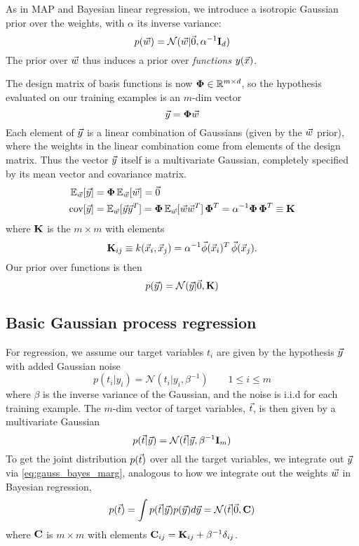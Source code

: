 \documentclass[11pt]{article}
\begin{document}
As in MAP and Bayesian linear regression, we introduce a isotropic Gaussian prior over
the weights, with $\alpha$ its inverse variance:
\begin{equation}
  p(\vec{w}) = \mathcal{N}(\vec{w} | \vec{0}, \alpha^{-1} \mathbf{I}_d)
\end{equation}
The prior over $\vec{w}$ thus induces a prior over \emph{functions} $y(\vec{x})$.

The design matrix of basis functions is now $\boldsymbol{\Phi} \in \mathbb{R}^{m \times d}$, so the
hypothesis evaluated on our training examples is an $m$-dim vector
\begin{equation}
  \vec{y} = \boldsymbol{\Phi} \vec{w}
\end{equation}
Each element of $\vec{y}$ is a linear combination of Gaussians (given by the $\vec{w}$
prior), where the weights in the linear combination come from elements of the design
matrix. Thus the vector $\vec{y}$ itself is a multivariate Gaussian, completely specified
by its mean vector and covariance matrix.
\begin{align}
  \mathbb{E}_{\vec{w}}[\vec{y}] &= \boldsymbol{\Phi}\, \mathbb{E}_{\vec{w}}[\vec{w}] = \vec{0} \\
  \textrm{cov}[\vec{y}]  &= \mathbb{E}_{\vec{w}}[\vec{y} \vec{y}^T]
                      = \boldsymbol{\Phi}\, \mathbb{E}_{\vec{w}}[\vec{w} \vec{w}^T]\, \boldsymbol{\Phi}^T
                      = \alpha^{-1} \boldsymbol{\Phi}\, \boldsymbol{\Phi}^T
                      \equiv \mathbf{K}
\end{align}
where $\mathbf{K}$ is the $m \times m$  with elements
\begin{equation}
  \mathbf{K}_{ij} \equiv k(\vec{x}_i, \vec{x}_j) = \alpha^{-1} \vec{\phi}(\vec{x}_i)^T\,
  \vec{\phi}(\vec{x}_j). 
\end{equation}
Our prior over functions is then
\begin{equation}
  p(\vec{y}) = \mathcal{N}(\vec{y} | \vec{0}, \mathbf{K})
\end{equation}

\subsection{Basic Gaussian process regression}
For regression, we assume our target variables $t_i$ are given by the hypothesis $\vec{y}$
with added Gaussian noise
\begin{equation}
  p(t_i | y_i) = \mathcal{N}(t_i | y_i, \beta^{-1}) \qquad 1 \leq i \leq m
\end{equation}
where $\beta$ is the inverse variance of the Gaussian, and the noise is i.i.d for each
training example. The $m$-dim vector of target variables, $\vec{t}$, is then given by a
multivariate Gaussian
\begin{equation}
  p(\vec{t} | \vec{y}) = \mathcal{N}(\vec{t} | \vec{y}, \beta^{-1} \mathbf{I}_m)
\end{equation}
To get the joint distribution $p(\vec{t})$ over all the target variables, we integrate out
$\vec{y}$ via \ref{eq:gauss_bayes_marg}, analogous to how we integrate out the weights
$\vec{w}$ in Bayesian regression,
\begin{equation}
  p(\vec{t}) = \int p(\vec{t} | \vec{y}) p(\vec{y}) d\vec{y} = \mathcal{N}(\vec{t} | \vec{0}, \mathbf{C})
\end{equation}
where $\mathbf{C}$ is $m \times m$ with elements
$\mathbf{C}_{ij} = \mathbf{K}_{ij} + \beta^{-1} \delta_{ij}$.
\end{document}
